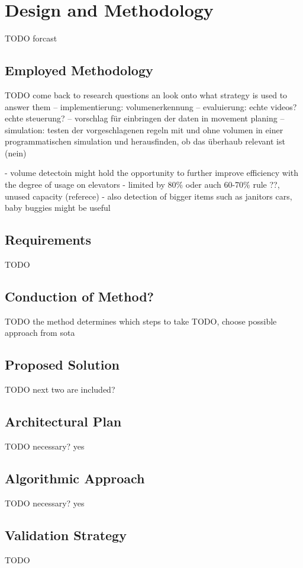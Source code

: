 \chapter{Design and Methodology}
\label{chap:design}
TODO forcast



\section{Employed Methodology}
TODO
come back to research questions an look onto what strategy is used to answer them
-- implementierung: volumenerkennung
-- evaluierung: echte videos? echte steuerung?
-- vorschlag für einbringen der daten in movement planing
-- simulation: testen der vorgeschlagenen regeln mit und ohne volumen in einer programmatischen simulation und herausfinden, ob das überhaub relevant ist (nein)

- volume detectoin might hold the opportunity to further improve efficiency with the degree of usage on elevators
- limited by 80\% oder auch 60-70\% rule \autocite[][p.~194]{unger2015aufzuege} ??, unused capacity (referece)
- also detection of bigger items such as janitors cars, baby buggies  might be useful

\section{Requirements}
TODO

\section{Conduction of Method?}
TODO the method determines which steps to take
TODO, choose possible approach from sota

\section{Proposed Solution}
TODO next two are included?

\section{Architectural Plan}
TODO necessary? yes

\section{Algorithmic Approach}
TODO necessary? yes

\section{Validation Strategy}

TODO